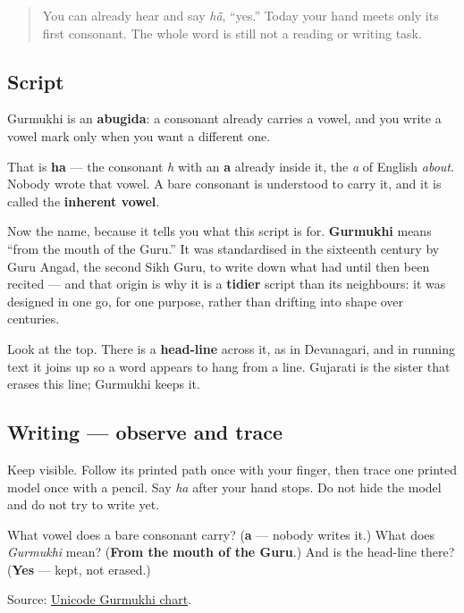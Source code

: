 \label{lesson:PA-W01-ha}



\begin{quote}
You can already hear and say \emph{hā̃}, “yes.” Today your hand meets only its first consonant. The whole word is still not a reading or writing task.
\end{quote}

\subsection*{Script}
Gurmukhi is an \textbf{abugida}: a consonant already carries a vowel, and you write a vowel mark only when you want a different one.

\begin{quote}
\end{quote}

That is \textbf{ha} — the consonant \emph{h} with an \textbf{a} already inside it, the \emph{a} of English \emph{about}. Nobody wrote that vowel. A bare consonant is understood to carry it, and it is called the \textbf{inherent vowel}.

Now the name, because it tells you what this script is for. \textbf{Gurmukhi} means \textquotedblleft{}from the mouth of the Guru.\textquotedblright{} It was standardised in the sixteenth century by Guru Angad, the second Sikh Guru, to write down what had until then been recited — and that origin is why it is a \textbf{tidier} script than its neighbours: it was designed in one go, for one purpose, rather than drifting into shape over centuries.

Look at the top. There is a \textbf{head-line} across it, as in Devanagari, and in running text it joins up so a word appears to hang from a line. Gujarati is the sister that erases this line; Gurmukhi keeps it.

\subsection*{Writing — observe and trace}

Keep \textbf{} visible. Follow its printed path once with your finger, then trace one printed model once with a pencil. Say \emph{ha} after your hand stops. Do not hide the model and do not try to write \textbf{} yet.

\begin{tcolorbox}[breakable,colback=teal!4,colframe=teal!35!black,title={Before you move on}]
What vowel does a bare consonant carry? (\textbf{a} — nobody writes it.) What does \emph{Gurmukhi} mean? (\textbf{From the mouth of the Guru}.) And is the head-line there? (\textbf{Yes} — kept, not erased.)

Source: \href{https://www.unicode.org/charts/PDF/U0A00.pdf}{Unicode Gurmukhi chart}.
\end{tcolorbox}

